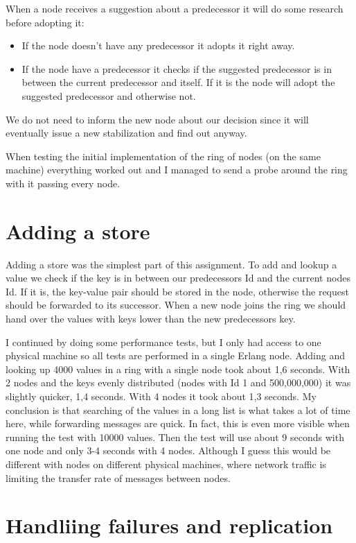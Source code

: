 \documentclass[a4paper, 11pt]{article}
\begin{document}
When a node receives a suggestion about a predecessor it will do some research before adopting it:
\begin{itemize}
	\item If the node doesn't have any predecessor it adopts it right away.
	\item If the node have a predecessor it checks if the suggested predecessor is in between the current predecessor and itself. If it is the node will adopt the suggested predecessor and otherwise not.
\end{itemize}

We do not need to inform the new node about our decision since it will eventually issue a new stabilization and find out anyway.

When testing the initial implementation of the ring of nodes (on the same machine) everything worked out and I managed to send a probe around the ring with it passing every node.

\section{Adding a store}

Adding a store was the simplest part of this assignment. To add and lookup a value we check if the key is in between our predecessors Id and the current nodes Id. If it is, the key-value pair should be stored in the node, otherwise the request should be forwarded to its successor. When a new node joins the ring we should hand over the values with keys lower than the new predecessors key.

I continued by doing some performance tests, but I only had access to one physical machine so all tests are performed in a single Erlang node. Adding and looking up 4000 values in a ring with a single node took about 1,6 seconds. With 2 nodes and the keys evenly distributed (nodes with Id 1 and 500,000,000) it was slightly quicker, 1,4 seconds. With 4 nodes it took about 1,3 seconds. My conclusion is that searching of the values in a long list is what takes a lot of time here, while forwarding messages are quick. In fact, this is even more visible when running the test with 10000 values. Then the test will use about 9 seconds with one node and only 3-4 seconds with 4 nodes. Although I guess this would be different with nodes on different physical machines, where network traffic is limiting the transfer rate of messages between nodes.

\section{Handliing failures and replication}
\end{document}
